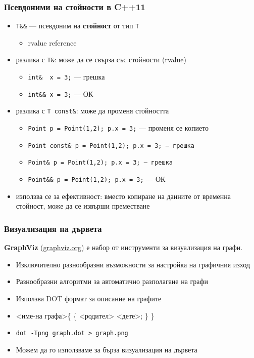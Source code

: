 \documentclass{beamer}
\begin{document}
\begin{frame}[fragile]
  \frametitle{Псевдоними на стойности в C++11}
  \begin{itemize}[<+->]
  \item \verb|T&&| --- псевдоним на \textbf{стойност} от тип \tt T
    \begin{itemize}
    \item rvalue reference
    \end{itemize}
  \item разлика с \verb|T&|: може да се свърза със стойности (rvalue)
    \begin{itemize}
    \item \verb|int&  x = 3;| --- \alert{грешка}
    \item \verb|int&& x = 3;| --- ОК
    \end{itemize}
  \item разлика с \verb|T const&|: може да променя стойността
    \begin{itemize}
    \item \verb|Point p = Point(1,2); p.x = 3;| --- променя се копието
    \item \tt{Point const\& p = Point(1,2); \alert{p.x = 3;}} --- \alert{грешка}
    \item \tt{\alert{Point\& p = Point(1,2);} p.x = 3;} --- \alert{грешка}
    \item \verb|Point&& p = Point(1,2); p.x = 3;| --- ОК
    \end{itemize}
  \item използва се за ефективност: вместо \alert{копиране} на данните от временна стойност, може да се извърши \alert{преместване}
  \end{itemize}
\end{frame}

\begin{frame}
  \frametitle{Визуализация на дървета}
  \textbf{GraphViz} (\url{graphviz.org}) е набор от инструменти за визуализация на графи.

  \begin{itemize}
  \item Изключително разнообразни възможности за настройка на графичния изход
  \item Разнообразни алгоритми за автоматично разполагане на графи
  \item Използва DOT формат за описание на графите
  \item {}<име-на графа>\tta\{ \{ <родител> \tta{->} <дете>\tta; \} \tta\}
  \item \tt{dot -Tpng graph.dot > graph.png}
  \item Можем да го използваме за бърза визуализация на дървета
  \end{itemize}

\end{frame}
\end{document}
